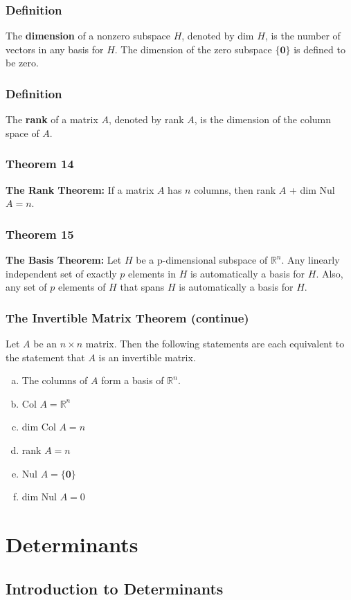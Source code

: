 \documentclass[letterpaper,11pt]{article}
\begin{document}
			\subsubsection{Definition}
				The \textbf{dimension} of a nonzero subspace $H$, denoted by dim $H$, is the number of vectors in any basis for $H$. The dimension of the zero subspace $\{\mathbf{0}\}$ is defined to be zero.
			\subsubsection{Definition}
				The \textbf{rank} of a matrix $A$, denoted by rank $A$, is the dimension of the column space of $A$.
			\subsubsection{Theorem 14}
				\textbf{The Rank Theorem:} If a matrix $A$ has $n$ columns, then rank $A$ + dim Nul $A=n$.
			\subsubsection{Theorem 15}
				\textbf{The Basis Theorem:} Let $H$ be a p-dimensional subspace of $\mathbb{R}^n$. Any linearly independent set of exactly $p$ elements in $H$ is automatically a basis for $H$. Also, any set of $p$ elements of $H$ that spans $H$ is automatically a basis for $H$.
			\subsubsection{The Invertible Matrix Theorem (continue)}
				Let $A$ be an $n\times n$ matrix. Then the following statements are each equivalent to the statement that $A$ is an invertible matrix.
				\begin{enumerate}[a.]
					\item The columns of $A$ form a basis of $\mathbb{R}^n$.
					\item Col $A=\mathbb{R}^n$
					\item dim Col $A=n$
					\item rank $A=n$
					\item Nul $A=\{\mathbf{0}\}$
					\item dim Nul $A=0$
				\end{enumerate}
	\section{Determinants}
		\subsection{Introduction to Determinants}
\end{document}
